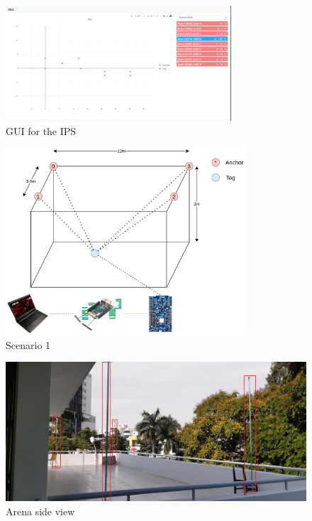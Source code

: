 \documentclass[\main/main.tex]{subfiles}
\begin{document}
\begin{figure}[H]   
    \centering
    \includegraphics[angle=90, width=0.75\textwidth]{result_gui.png}
    \caption{GUI for the IPS}
    \label{fig:result_gui}
\end{figure}

 
\begin{figure}[H]
    \centering
    \includegraphics[width=0.8\textwidth]{system_overview_phy.png}
    \caption{Scenario 1}
    \label{fig:scenario_1}
\end{figure}

\begin{figure}[H]      
    \centering
    \includegraphics[width=1\textwidth]{arena_00.jpg}
    \caption{Arena side view}
    \label{fig:arena_00}
\end{figure}
\end{document}
